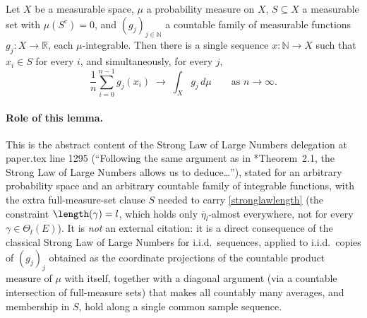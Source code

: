 \begin{lemma}
  Let $X$ be a measurable space, $\mu$ a probability measure on $X$, $S \subseteq X$ a measurable
  set with $\mu(S^c) = 0$, and $(g_j)_{j \in \mathbb{N}}$ a countable family of measurable functions
  $g_j \colon X \to \mathbb{R}$, each $\mu$-integrable. Then there is a single sequence
  $x \colon \mathbb{N} \to X$ such that $x_i \in S$ for every $i$, and simultaneously, for every $j$,
  \[
    \frac{1}{n}\sum_{i=0}^{n-1} g_j(x_i) \;\longrightarrow\; \int_X g_j \, d\mu
    \qquad\text{as } n \to \infty
    .
  \]

  \paragraph{Role of this lemma.} This is the abstract content of the Strong Law of Large Numbers
  delegation at paper.tex line 1295 (``Following the same argument as in \cite{GHS}*{Theorem~2.1},
  the Strong Law of Large Numbers allows us to deduce\ldots''), stated for an arbitrary probability
  space and an arbitrary countable family of integrable functions, with the extra full-measure-set
  clause $S$ needed to carry \eqref{stronglawlength} (the constraint $\length(\gamma) = l$, which
  holds only $\overline\eta_l$-almost everywhere, not for every $\gamma \in \Theta_l(E)$). It is
  \emph{not} an external citation: it is a direct consequence of the classical Strong Law of Large
  Numbers for i.i.d.\ sequences, applied to i.i.d.\ copies of $(g_j)_j$ obtained as the coordinate
  projections of the countable product measure of $\mu$ with itself, together with a diagonal
  argument (via a countable intersection of full-measure sets) that makes all countably many
  averages, and membership in $S$, hold along a single common sample sequence.
\end{lemma}
